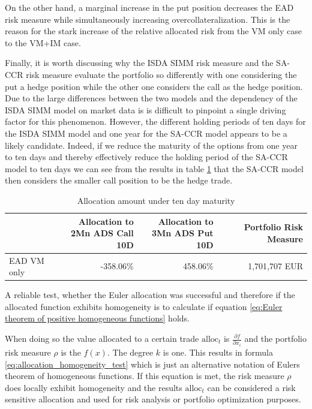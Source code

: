 \documentclass[../Thesis_AHoecherl.tex]{subfiles}
\begin{document}
    On the other hand, a marginal increase in the put position decreases the \gls{EAD} risk measure while simultaneously increasing overcollateralization. This is the reason for the stark increase of the relative allocated risk from the \gls{VM} only case to the \gls{VM}+IM case.

    Finally, it is worth discussing why the \gls{ISDA SIMM} risk measure and the \gls{SA-CCR} risk measure evaluate the portfolio so differently with one considering the put a hedge position while the other one considers the call as the hedge position.
    Due to the large differences between the two models and the dependency of the \gls{ISDA SIMM} model on market data is is difficult to pinpoint a single driving factor for this phenomenon.
    However, the different holding periods of ten days for the \gls{ISDA SIMM} model and one year for the \gls{SA-CCR} model appears to be a likely candidate. Indeed, if we reduce the maturity of the options from one year to ten days and thereby effectively reduce the holding period of the \gls{SA-CCR} model to ten days we can see from the results in table \ref{tab:2TradeEquity10dayEAD} that the \gls{SA-CCR} model then considers the smaller call position to be the hedge trade.

    \begin{table}[htbp]
        \centering
        \begin{tabular}{l||r|r|r}
                & \makecell{Allocation to \\ 2Mn ADS Call 10D} & \makecell{Allocation to \\ 3Mn ADS Put 10D} & Portfolio Risk Measure \\
                \toprule
                \gls{EAD} \gls{VM} only & -358.06\% & 458.06\% & 1,701,707 EUR \\
        \end{tabular}%
        \caption{Allocation amount under ten day maturity}
        \label{tab:2TradeEquity10dayEAD}%
    \end{table}%

    A reliable test, whether the Euler allocation was successful and therefore if the allocated function exhibits homogeneity is to calculate if equation \ref{eq:Euler theorem of positive homogeneous functions} holds.

    When doing so the value allocated to a certain trade $\text{alloc}_{t}$ is $\frac{\partial f}{\partial x_i}$ and the portfolio risk measure $\rho$ is the $f(x)$. The degree $k$ is one. 
    This results in formula \ref{eq:allocation_homogeneity_test} which is just an alternative notation of Eulers theorem of homogeneous functions. If this equation is met, the risk measure $\rho$ does locally exhibit homogeneity and the results $\text{alloc}_t$ can be considered a risk sensitive allocation and used for risk analysis or portfolio optimization purposes.
\end{document}
